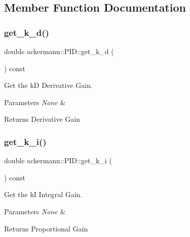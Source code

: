\subsection{Member Function Documentation}
\mbox{\label{classackermann_1_1_p_i_d_aaf565af4f72abcf148b8abe8880df6c3}} 
\subsubsection{\texorpdfstring{get\+\_\+k\+\_\+d()}{get\_k\_d()}}
{\footnotesize\ttfamily double ackermann\+::\+P\+I\+D\+::get\+\_\+k\+\_\+d (\begin{DoxyParamCaption}{ }\end{DoxyParamCaption}) const}



Get the kD Derivative Gain. 


\begin{DoxyParams}{Parameters}
{\em None} & \\
\hline
\end{DoxyParams}
\begin{DoxyReturn}{Returns}
Derivative Gain 
\end{DoxyReturn}
\mbox{\label{classackermann_1_1_p_i_d_a9845f8af09db7e901d319c53e4e43268}} 
\subsubsection{\texorpdfstring{get\+\_\+k\+\_\+i()}{get\_k\_i()}}
{\footnotesize\ttfamily double ackermann\+::\+P\+I\+D\+::get\+\_\+k\+\_\+i (\begin{DoxyParamCaption}{ }\end{DoxyParamCaption}) const}



Get the kI Integral Gain. 


\begin{DoxyParams}{Parameters}
{\em None} & \\
\hline
\end{DoxyParams}
\begin{DoxyReturn}{Returns}
Proportional Gain 
\end{DoxyReturn}
\mbox{\label{classackermann_1_1_p_i_d_a3257bf60c93eb2a3b18b48a40a480b2d}} 
